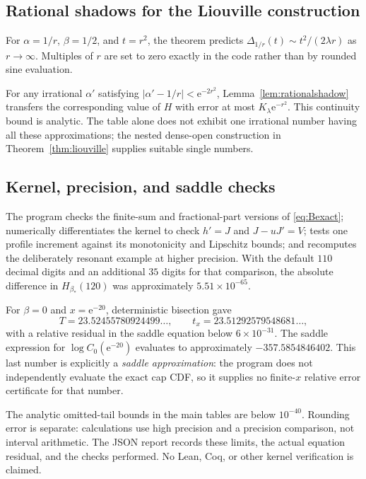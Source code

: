 \documentclass[11pt,a4paper]{article}
\theoremstyle{definition}
\theoremstyle{remark}\newtheorem{remark}[theorem]{Remark}
\newcommand{\e}{\mathrm e}
\begin{document}
\subsection{Rational shadows for the Liouville construction}

For $\alpha=1/r$, $\beta=1/2$, and $t=r^2$, the theorem predicts
$\Delta_{1/r}(t)\sim t^2/(2\lambda r)$ as $r\to\infty$.
Multiples of $r$ are set to zero exactly in the code rather than by rounded
sine evaluation.

\begin{center}\small

\end{center}

For any irrational $\alpha'$ satisfying
$|\alpha'-1/r|<\e^{-2r^2}$, Lemma~\ref{lem:rationalshadow} transfers the
corresponding value of $H$ with error at most $K_\lambda\e^{-r^2}$.
This continuity bound is analytic.  The table alone does not exhibit one
irrational number having all these approximations; the nested dense-open
construction in Theorem~\ref{thm:liouville} supplies suitable single numbers.

\subsection{Kernel, precision, and saddle checks}

The program checks the finite-sum and fractional-part versions of
\eqref{eq:Bexact}; numerically differentiates the kernel to check
$h'=J$ and $J-uJ'=V$; tests one profile increment against its monotonicity and
Lipschitz bounds; and recomputes the deliberately resonant example at higher
precision.  With the default $110$ decimal digits and an additional
$35$ digits for that comparison, the absolute difference in $H_{\beta_*}(120)$
was approximately $5.51\times10^{-65}$.

For $\beta=0$ and $x=\e^{-20}$, deterministic bisection gave
\[
 T=23.52455780924499\ldots,\qquad
 t_x=23.51292579548681\ldots,
\]
with a relative residual in the saddle equation below $6\times10^{-31}$.
The saddle expression for $\log C_0(\e^{-20})$ evaluates to approximately
$-357.5854846402$.  This last number is explicitly a \emph{saddle
approximation}: the program does not independently evaluate the exact cap
CDF, so it supplies no finite-$x$ relative error certificate for that number.

The analytic omitted-tail bounds in the main tables are below $10^{-40}$.
Rounding error is separate: calculations use high precision and a precision
comparison, not interval arithmetic.  The JSON report records these limits,
the actual equation residual, and the checks performed.  No Lean, Coq, or
other kernel verification is claimed.
\end{document}
